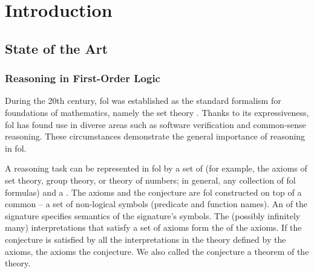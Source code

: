 
\chapter{Introduction}
\glsresetall


\section{State of the Art}
\label{sec:sota}

\subsection{Reasoning in First-Order Logic}


During the 20th century, \gls{fol} was established as the standard formalism for foundations of mathematics, namely the set theory \cite{DBLP:journals/bsl/Ferreiros01}.
Thanks to its expressiveness, \gls{fol} has found use in diverse areas such as software verification and common-sense reasoning.
These circumstances demonstrate the general importance of reasoning in \gls{fol}.

A reasoning task can be represented in \gls{fol} by a set of  (for example, the axioms of set theory, group theory, or theory of numbers; in general, any collection of \gls{fol} formulas) and a .
The axioms and the conjecture are \gls{fol}  constructed on top of a common  -- a set of non-logical symbols (predicate and function names).
An  of the signature specifies semantics of the signature's symbols.
The (possibly infinitely many) interpretations that satisfy a set of axioms form the  of the axioms.
If the conjecture is satisfied by all the interpretations in the theory defined by the axioms,
the axioms  the conjecture.
We also called the conjecture a theorem of the theory.

